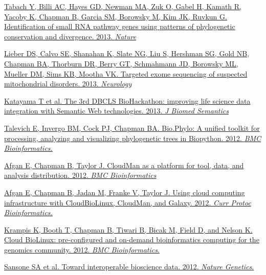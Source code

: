 \documentclass[10pt]{article}
\makeatletter
\newlength{\bibhang}
\newlength{\bibsep}
 {\@listi \global\bibsep\itemsep \global\advance\bibsep by\parsep}
\newenvironment{bibsection}%
        {\vspace{-\baselineskip}\begin{list}{}{%
       \setlength{\leftmargin}{\bibhang}%
       \setlength{\itemindent}{-\leftmargin}%
       \setlength{\itemsep}{\bibsep}%
       \setlength{\parsep}{\z@}%
        \setlength{\partopsep}{0pt}%
        \setlength{\topsep}{0pt}}}
        {\end{list}\vspace{-.6\baselineskip}}
\makeatother
\begin{document}
\begin{bibsection}
  \item \href{http://www.nature.com/nature/journal/v493/n7434/full/nature11779.html}
    {Tabach Y, Billi AC, Hayes GD, Newman MA, Zuk O, Gabel H, Kamath R, Yacoby
     K, Chapman B, Garcia SM, Borowsky M, Kim JK, Ruvkun G.
     Identification of small RNA pathway genes using patterns of phylogenetic
     conservation and divergence. 2013. \textit{Nature}}

  \item \href{http://www.neurology.org/content/80/19/1762.long}
    {Lieber DS, Calvo SE, Shanahan K, Slate NG, Liu S, Hershman SG, Gold NB,
     Chapman BA, Thorburn DR, Berry GT, Schmahmann JD, Borowsky ML, Mueller DM,
     Sims KB, Mootha VK.
     Targeted exome sequencing of suspected mitochondrial disorders. 2013.
     \textit{Neurology}}

  \item \href{http://www.jbiomedsem.com/content/4/1/6}
    {Katayama T et al.
    The 3rd DBCLS BioHackathon: improving life science data integration with
    Semantic Web technologies. 2013. \textit{J Biomed Semantics}}

  \item \href{http://www.biomedcentral.com/1471-2105/13/209}
    {Talevich E, Invergo BM, Cock PJ, Chapman BA.
    Bio.Phylo: A unified toolkit for processing, analyzing and
    visualizing phylogenetic trees in Biopython. 2012.
    \textit{BMC Bioinformatics.}}

  \item \href{http://www.biomedcentral.com/1471-2105/13/315}
    {Afgan E, Chapman B, Taylor J.
     CloudMan as a platform for tool, data, and analysis distribution. 2012.
     \textit{BMC Bioinformatics}}

  \item \href{http://cda.currentprotocols.com/WileyCDA/CPUnit/refId-bi1109.html}
    {Afgan E, Chapman B, Jadan M, Franke V, Taylor J. Using cloud
      computing infrastructure with CloudBioLinux, CloudMan, and
      Galaxy. 2012. \textit{Curr Protoc Bioinformatics.}}

  \item \href{http://www.biomedcentral.com/1471-2105/13/42/}
   {Krampis K, Booth T, Chapman B, Tiwari B, Bicak M, Field D, and Nelson K.
    Cloud BioLinux: pre-configured and on-demand bioinformatics
    computing for the genomics community. 2012. \textit{BMC Bioinformatics}.}

  \item \href{http://www.nature.com/ng/journal/v44/n2/full/ng.1054.html}
    {Sansone SA et al. Toward interoperable bioscience data. 2012.
    \textit{Nature Genetics}.}


\end{bibsection}
\end{document}
